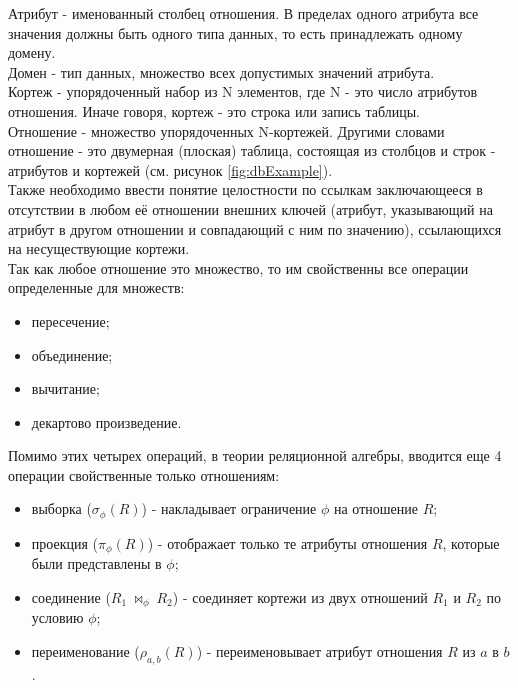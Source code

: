 \indent Атрибут - именованный столбец отношения.
В пределах одного атрибута все значения должны быть одного типа данных, то есть принадлежать одному домену.\\
\indent Домен - тип данных, множество всех допустимых значений атрибута.\\
\indent Кортеж - упорядоченный набор из N элементов, где N - это число атрибутов отношения.
Иначе говоря, кортеж - это строка или запись таблицы.\\
\indent Отношение - множество упорядоченных N-кортежей.
Другими словами отношение - это двумерная (плоская) таблица, состоящая из столбцов и строк - атрибутов и кортежей (см. рисунок \ref{fig:dbExample}).\\
\indent Также необходимо ввести понятие целостности по ссылкам заключающееся в отсутствии в любом её отношении внешних ключей (атрибут, указывающий на атрибут в другом отношении и совпадающий с ним по значению), ссылающихся на несуществующие кортежи.\\
\indent Так как любое отношение это множество, то им свойственны все операции определенные для множеств:
\begin{itemize}
	\item пересечение;
	\item объединение;
	\item вычитание;
	\item декартово произведение.
\end{itemize}
\indent Помимо этих четырех операций, в теории реляционной алгебры, вводится еще 4 операции свойственные только отношениям:
\begin{itemize}
	\item выборка ($\sigma_\phi(R)$) - накладывает ограничение $\phi$ на отношение $R$;
	\item проекция ($\pi_\phi(R)$) - отображает только те атрибуты отношения $R$, которые были представлены в $\phi$;
	\item соединение ($R_1\ \bowtie_\phi\ R_2$) - соединяет кортежи из двух отношений $R_1$ и $R_2$ по условию $\phi$;
	\item переименование ($\rho_{a,b}(R)$) - переименовывает атрибут отношения $R$ из $a$ в $b$ .
\end{itemize}

